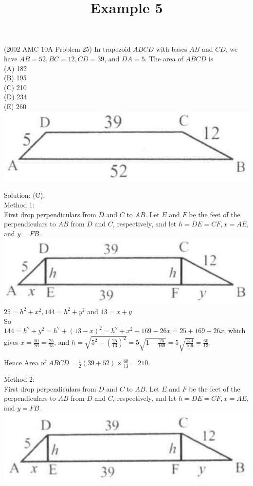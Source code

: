 \documentclass{article}
\title{Example 5}
\date{}
\begin{document}
\maketitle

(2002 AMC 10A Problem 25) In trapezoid \(A B C D\) with bases \(A B\) and \(C D\), we have \(A B=52, B C=12, C D=39\), and \(D A=5\). The area of \(A B C D\) is\\
(A) 182\\
(B) 195\\
(C) 210\\
(D) 234\\
(E) 260\\
\centering
\includegraphics[width=\textwidth]{images/077(1).jpg}

Solution: (C).\\
Method 1:\\
First drop perpendiculars from \(D\) and \(C\) to \(A B\). Let \(E\) and \(F\) be the feet of the perpendiculars to \(A B\) from \(D\) and \(C\), respectively, and let \(h=D E=C F, x=A E\), and \(y=F B\).\\
\centering
\includegraphics[width=\textwidth]{images/077.jpg}\\
\(25=h^{2}+x^{2}, 144=h^{2}+y^{2}\) and \(13=x+y\)\\
So\\
\(144=h^{2}+y^{2}=h^{2}+(13-x)^{2}=h^{2}+x^{2}+169-26 x=25+169-26 x\), which gives \(x=\frac{50}{26}=\frac{25}{13}\), and \(h=\sqrt{5^{2}-\left(\frac{25}{13}\right)^{2}}=5 \sqrt{1-\frac{25}{169}}=5 \sqrt{\frac{144}{169}}=\frac{60}{13}\).


Hence Area of \(A B C D=\frac{1}{2}(39+52) \times \frac{60}{13}=210\).

Method 2:\\
First drop perpendiculars from \(D\) and \(C\) to \(A B\). Let \(E\) and \(F\) be the feet of the perpendiculars to \(A B\) from \(D\) and \(C\), respectively, and let \(h=D E=C F, x=A E\), and \(y=F B\).\\
\centering
\includegraphics[width=\textwidth]{images/078(1).jpg}
\end{document}
